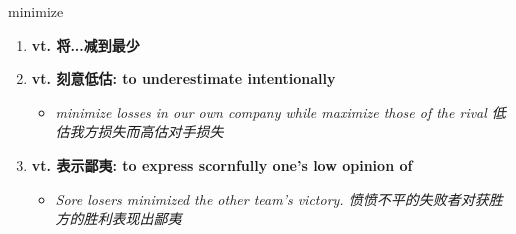 
\begin{frame}
{\huge minimize}
\begin{center}
\begin{enumerate}\Large
  \item \textbf{vt. 将...减到最少}
  \item \textbf{vt. 刻意低估: to underestimate intentionally}
  \begin{itemize}
    \item \em{\Large{minimize losses in our own company while maximize those of the rival 低估我方损失而高估对手损失}}
  \end{itemize}
  \item \textbf{vt. 表示鄙夷: to express scornfully one's low opinion of}
  \begin{itemize}
    \item \em{\Large{Sore losers minimized the other team's victory. 愤愤不平的失败者对获胜方的胜利表现出鄙夷}}
  \end{itemize}
\end{enumerate}
\end{center}
\end{frame}
